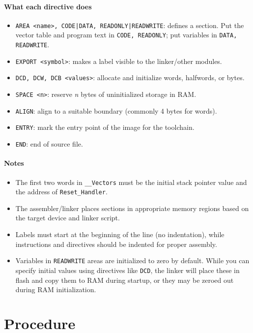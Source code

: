 \paragraph{What each directive does}
\begin{itemize}[nosep]
  \item \texttt{AREA <name>, CODE|DATA, READONLY|READWRITE}:
        defines a section. Put the vector table and program text in \texttt{CODE, READONLY};
        put variables in \texttt{DATA, READWRITE}.
  \item \texttt{EXPORT <symbol>}: makes a label visible to the linker/other modules.
  \item \texttt{DCD, DCW, DCB <values>}: allocate and initialize words, halfwords, or bytes.
  \item \texttt{SPACE <n>}: reserve \textit{n} bytes of uninitialized storage in RAM.
  \item \texttt{ALIGN}: align to a suitable boundary (commonly 4 bytes for words).
  \item \texttt{ENTRY}: mark the entry point of the image for the toolchain.
  \item \texttt{END}: end of source file.
\end{itemize}

\paragraph{Notes}
\begin{itemize}[nosep]
    \item The first two words in \texttt{\_\_Vectors} must be the initial stack pointer value and the address of \texttt{Reset\_Handler}.
    \item The assembler/linker places sections in appropriate memory regions based on the target device and linker script.
    \item Labels must start at the beginning of the line (no indentation), while instructions and directives should be indented for proper assembly.
    \item Variables in \texttt{READWRITE} areas are initialized to zero by default. While you can specify initial values using directives like \texttt{DCD}, the linker will place these in flash and copy them to RAM during startup, or they may be zeroed out during RAM initialization.
\end{itemize}

\newpage
\section{Procedure}
